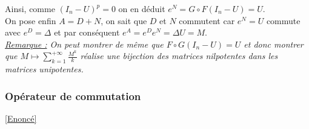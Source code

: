 \documentclass[8pt]{book}
\begin{document}
\begin{enumerate}[leftmargin=*]
		Ainsi, comme $(I_n-U)^p=0$ on en déduit $e^N=G\circ F(I_n-U)=U$.\\
		On pose enfin $A=D+N$, on sait que $D$ et $N$ commutent car $e^N=U$ commute avec $e^D=\Delta$ et par conséquent $e^A=e^De^N=\Delta U=M$.\\
		\textit{\underline{Remarque :} On peut montrer de même que $F\circ G(I_n-U)=U$ et donc montrer que $M\mapsto\displaystyle\sum_{k=1}^{+\infty}\frac{M^k}{k}$ réalise une bijection des matrices nilpotentes dans les matrices unipotentes.}
	\end{enumerate}
	
	\subsubsection{Opérateur de commutation }
	\label{Opérateur de commutation corrigé}
	\textcolor{blue}{\hyperref[Opérateur de commutation]{[Enoncé]}}\\
\end{document}
